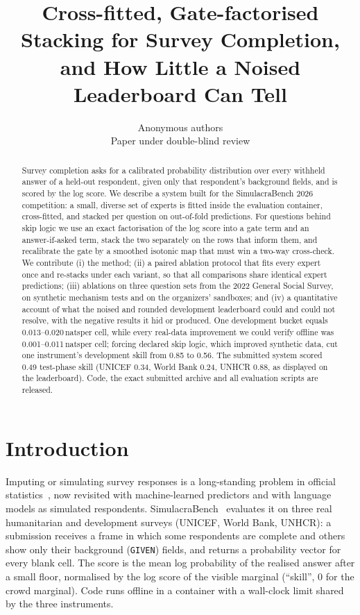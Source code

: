 \documentclass[10pt]{article}
\title{Cross-fitted, Gate-factorised Stacking for Survey Completion,\\ and How Little a Noised Leaderboard Can Tell}
\author{\name Anonymous authors \\ \addr Paper under double-blind review}
\newcommand{\nats}{\,nats}
\begin{document}
\maketitle

\begin{abstract}
Survey completion asks for a calibrated probability distribution over every withheld answer of a held-out respondent, given only that respondent's background fields, and is scored by the log score. We describe a system built for the SimulacraBench 2026 competition: a small, diverse set of experts is fitted inside the evaluation container, cross-fitted, and stacked per question on out-of-fold predictions. For questions behind skip logic we use an exact factorisation of the log score into a gate term and an answer-if-asked term, stack the two separately on the rows that inform them, and recalibrate the gate by a smoothed isotonic map that must win a two-way cross-check. We contribute (i) the method; (ii) a paired ablation protocol that fits every expert once and re-stacks under each variant, so that all comparisons share identical expert predictions; (iii) ablations on three question sets from the 2022 General Social Survey, on synthetic mechanism tests and on the organizers' sandboxes; and (iv) a quantitative account of what the noised and rounded development leaderboard could and could not resolve, with the negative results it hid or produced. One development bucket equals 0.013--0.020\nats per cell, while every real-data improvement we could verify offline was 0.001--0.011\nats per cell; forcing declared skip logic, which improved synthetic data, cut one instrument's development skill from 0.85 to 0.56. The submitted system scored 0.49 test-phase skill (UNICEF 0.34, World Bank 0.24, UNHCR 0.88, as displayed on the leaderboard). Code, the exact submitted archive and all evaluation scripts are released.
\end{abstract}

\section{Introduction}
\label{sec:intro}

Imputing or simulating survey responses is a long-standing problem in official statistics~\citep{rubin1987multiple,andridge2010hotdeck,vanbuuren2011mice}, now revisited with machine-learned predictors and with language models as simulated respondents. SimulacraBench~\citep{simulacrabench2026} evaluates it on three real humanitarian and development surveys (UNICEF, World Bank, UNHCR): a submission receives a frame in which some respondents are complete and others show only their background (\texttt{GIVEN}) fields, and returns a probability vector for every blank cell. The score is the mean log probability of the realised answer after a small floor, normalised by the log score of the visible marginal (``skill'', 0 for the crowd marginal). Code runs offline in a container with a wall-clock limit shared by the three instruments.
\end{document}
